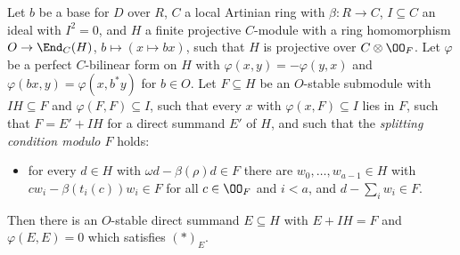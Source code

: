 \begin{proposition}\label{pf:ks1:prop-laglift}
Let $b$ be a base for $D$ over $R$, $C$ a local Artinian ring with $\beta:R\to C$, $I\subseteq C$ an ideal with $I^2=0$, and $H$ a finite projective
$C$-module with a ring homomorphism $O\to\End_C(H)$, $b\mapsto(x\mapsto bx)$, such that $H$ is projective over $C\otimes\OO_F$. Let $\varphi$ be a
perfect $C$-bilinear form on $H$ with $\varphi(x,y)=-\varphi(y,x)$ and $\varphi(bx,y)=\varphi(x,b^*y)$ for $b\in O$. Let $F\subseteq H$ be an $O$-stable submodule with
$IH\subseteq F$ and $\varphi(F,F)\subseteq I$, such that every $x$ with $\varphi(x,F)\subseteq I$ lies in $F$, such that $F=E'+IH$ for a direct
summand $E'$ of $H$, and such that the \emph{splitting condition modulo $F$} holds:
\begin{itemize}
\item[$(*)_F$] for every $d\in H$ with $\omega d-\beta(\rho)d\in F$ there are $w_0,\dots,w_{a-1}\in H$ with $cw_i-\beta(t_i(c))w_i\in F$ for all
  $c\in\OO_F$ and $i<a$, and $d-\sum_iw_i\in F$.
\end{itemize}
Then there is an $O$-stable direct summand $E\subseteq H$ with $E+IH=F$ and $\varphi(E,E)=0$ which satisfies $(*)_E$.
\end{proposition}

